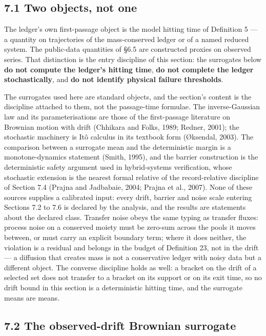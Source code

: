 \documentclass[11pt]{article}
\begin{document}
\subsection*{7.1 Two objects, not one}\label{71-two-objects-not-one}

The ledger's own first-passage object is the model hitting time of Definition 5 --- a quantity on trajectories of the mass-conserved ledger or of a named reduced system. The public-data quantities of \S6.5 are constructed proxies on observed series. That distinction is the entry discipline of this section: the surrogates below \textbf{do not compute the ledger's hitting time}, \textbf{do not complete the ledger stochastically}, and \textbf{do not identify physical failure thresholds}.

The surrogates used here are standard objects, and the section's content is the discipline attached to them, not the passage-time formulae. The inverse-Gaussian law and its parameterisations are those of the first-passage literature on Brownian motion with drift (Chhikara and Folks, 1989; Redner, 2001); the stochastic machinery is It\^{o} calculus in its textbook form (\O{}ksendal, 2003). The comparison between a surrogate mean and the deterministic margin is a monotone-dynamics statement (Smith, 1995), and the barrier construction is the deterministic safety argument used in hybrid-systems verification, whose stochastic extension is the nearest formal relative of the record-relative discipline of Section 7.4 (Prajna and Jadbabaie, 2004; Prajna et al., 2007). None of these sources supplies a calibrated input: every drift, barrier and noise scale entering Sections 7.2 to 7.6 is declared by the analysis, and the results are statements about the declared class. Transfer noise obeys the same typing as transfer fluxes: process noise on a conserved moiety must be zero-sum across the pools it moves between, or must carry an explicit boundary term; where it does neither, the violation is a residual and belongs in the budget of Definition 23, not in the drift --- a diffusion that creates mass is not a conservative ledger with noisy data but a different object. The converse discipline holds as well: a bracket on the drift of a selected set does not transfer to a bracket on its support or on its exit time, so no drift bound in this section is a deterministic hitting time, and the surrogate means are means.

\subsection*{7.2 The observed-drift Brownian surrogate}\label{72-the-observed-drift-brownian-surrogate}
\end{document}
